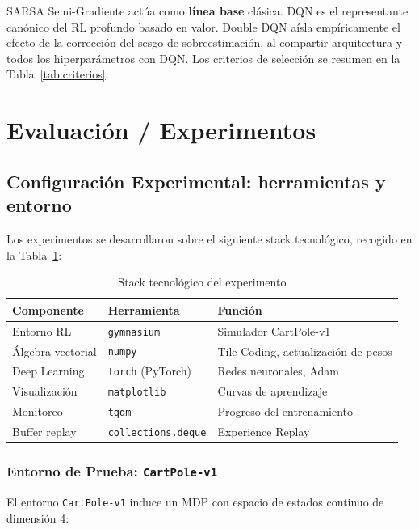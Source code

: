SARSA Semi-Gradiente actúa como \textbf{línea base} clásica. DQN es el representante canónico del RL profundo basado en valor. Double DQN aísla empíricamente el efecto de la corrección del sesgo de sobreestimación, al compartir arquitectura y todos los hiperparámetros con DQN. Los criterios de selección se resumen en la Tabla~\ref{tab:criterios}.

\section{Evaluación / Experimentos}

\subsection{Configuración Experimental: herramientas y entorno}

Los experimentos se desarrollaron sobre el siguiente stack tecnológico, recogido en la Tabla~\ref{tab:stack}:

\begin{table}[htb!]
\caption{Stack tecnológico del experimento}\label{tab:stack}
\centering\small
\begin{tabular}{@{}llp{7cm}@{}}
\toprule
\textbf{Componente} & \textbf{Herramienta} & \textbf{Función} \\
\midrule
Entorno RL & \texttt{gymnasium} \cite{Towers2023} & Simulador CartPole-v1 \\
Álgebra vectorial & \texttt{numpy} & Tile Coding, actualización de pesos \\
Deep Learning & \texttt{torch} (PyTorch) & Redes neuronales, Adam \\
Visualización & \texttt{matplotlib} & Curvas de aprendizaje \\
Monitoreo & \texttt{tqdm} & Progreso del entrenamiento \\
Buffer replay & \texttt{collections.deque} & Experience Replay \\
\bottomrule
\end{tabular}
\end{table}

\subsubsection{Entorno de Prueba: \texttt{CartPole-v1}}

El entorno \texttt{CartPole-v1} induce un MDP con espacio de estados continuo de dimensión 4:

